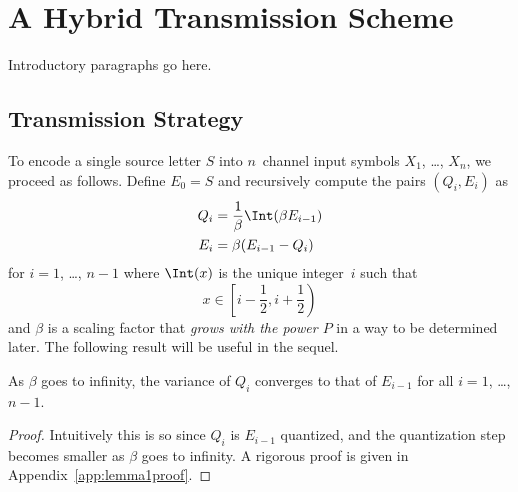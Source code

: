 \chapter{A Hybrid Transmission Scheme}
\label{ch:qescheme}

Introductory paragraphs go here.

\section{Transmission Strategy}
\label{sec:commscheme}

To encode a single source letter $S$ into $n$~channel input symbols $X_1$,
\dots, $X_n$, we proceed as follows. Define $E_0 = S$ and recursively compute
the pairs $(Q_i, E_i)$ as
\begin{align}
  Q_i &= \frac{1}{\beta} \Int(\beta E_{i-1}) \nonumber \\
  E_i &= \beta (E_{i-1} - Q_i) \label{eq:QEdef}
\end{align}
for $i = 1$, \dots, $n-1$ where $\Int(x)$ is the unique integer~$i$ such that
\begin{equation*}
  x \in \left[ i - \frac12 , i + \frac12 \right)
\end{equation*}
and $\beta$ is a scaling factor that \emph{grows with the power $P$}
in a way to be determined later.  The following result will be useful in the
sequel.
\begin{lemma}
  \label{lem:qvarconvergence}
  As $\beta$ goes to infinity, the variance of $Q_i$ converges to that of
  $E_{i-1}$ for all $i = 1$, \dots, $n-1$. 
\end{lemma}

\begin{proof}
  Intuitively this is so since $Q_i$ is $E_{i-1}$ quantized, and the
  quantization step becomes smaller as $\beta$ goes to infinity.  A rigorous
  proof is given in Appendix~\ref{app:lemma1proof}.
\end{proof}

